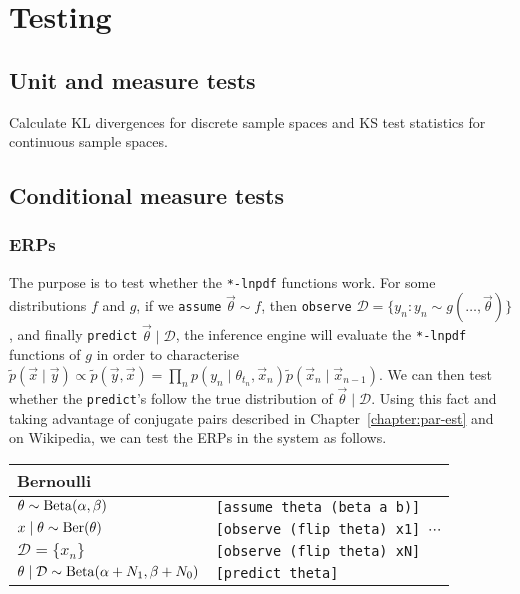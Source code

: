 \section{Testing}
\subsection{Unit and measure tests}
Calculate KL divergences for discrete sample spaces and KS test statistics for continuous sample spaces.
\subsection{Conditional measure tests}
\subsubsection{ERPs}
The purpose is to test whether the \verb!*-lnpdf! functions work. For some distributions $f$ and $g$, if we \verb!assume! $\vec\theta \sim f$, then \verb!observe! $\mathcal D = \{y_n : y_n \sim g(\dotsc, \vec \theta)\}$, and finally \verb!predict! $\vec\theta \mid \mathcal D$, the inference engine will evaluate the \verb!*-lnpdf! functions of $g$ in order to characterise $\tilde p(\vec x \mid \vec y) \propto \tilde p(\vec y, \vec x) = \prod_n p(y_n \mid \theta_{t_n}, \vec x_n) \tilde p(\vec x_n \mid \vec x_{n - 1})$. We can then test whether the \verb!predict!'s follow the true distribution of $\vec\theta \mid \mathcal D$. Using this fact and taking advantage of conjugate pairs described in Chapter~\ref{chapter:par-est} and on Wikipedia, we can test the ERPs in the system as follows.

\begin{table}[h]
\begin{tabular}{ll}
\toprule
Bernoulli & \\
\midrule
$\theta \sim \operatorname{Beta}(\alpha, \beta)$								& \texttt{[assume theta (beta a b)]} \\
$x \mid \theta \sim \operatorname{Ber}(\theta)$								& \texttt{[observe (flip theta) x1] $\cdots$} \\
$\mathcal D = \{x_n\}$											& \texttt{[observe (flip theta) xN]} \\
$\theta \mid \mathcal D \sim \operatorname{Beta}(\alpha + N_1, \beta + N_0)$	& \texttt{[predict theta]} \\
\bottomrule
\end{tabular}
\end{table}

